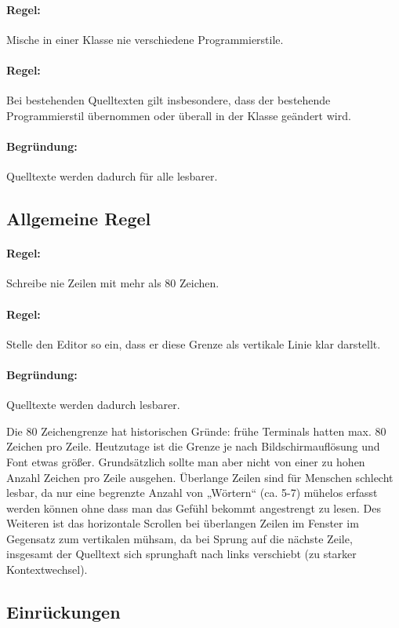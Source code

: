 \paragraph{Regel:} Mische in einer Klasse nie verschiedene Programmierstile.
\paragraph{Regel:} Bei bestehenden Quelltexten gilt insbesondere, dass der bestehende Programmierstil übernommen oder überall in der Klasse geändert wird.
\paragraph{Begründung:} Quelltexte werden dadurch für alle lesbarer.

\subsection{Allgemeine Regel}

\paragraph{Regel:} Schreibe nie Zeilen mit mehr als 80 Zeichen.
\paragraph{Regel:} Stelle den Editor so ein, dass er diese Grenze als vertikale Linie klar darstellt.
\paragraph{Begründung:} Quelltexte werden dadurch lesbarer.

Die 80 Zeichengrenze hat historischen Gründe: frühe Terminals hatten max. 80 Zeichen pro Zeile. Heutzutage ist die Grenze je nach Bildschirmauflösung und Font etwas größer. Grundsätzlich sollte man aber nicht von einer zu hohen Anzahl Zeichen pro Zeile ausgehen. Überlange Zeilen sind für Menschen schlecht lesbar, da nur eine begrenzte Anzahl von „Wörtern“ (ca. 5-7) mühelos erfasst werden können ohne dass man das Gefühl bekommt angestrengt zu lesen. Des Weiteren ist das horizontale Scrollen bei überlangen Zeilen im Fenster im Gegensatz zum vertikalen mühsam, da bei Sprung auf die nächste Zeile, insgesamt der Quelltext sich sprunghaft nach links verschiebt (zu starker Kontextwechsel).

\subsection{Einrückungen}

